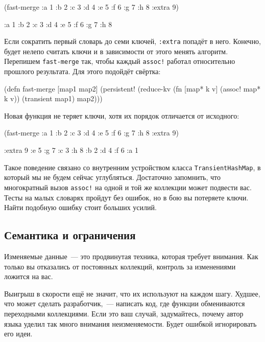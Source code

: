 \begin{english}
  \begin{clojure}
(fast-merge
 {:a 1 :b 2 :c 3 :d 4 :e 5 :f 6 :g 7 :h 8}
 {:extra 9})

{:a 1 :b 2 :c 3 :d 4 :e 5 :f 6 :g 7 :h 8}
  \end{clojure}
\end{english}

Если сократить первый словарь до семи ключей, \verb|:extra| попадёт в
него. Конечно, будет нелепо считать ключи и в зависимости от этого менять
алгоритм. Перепишем \verb|fast-merge| так, чтобы каждый \verb|assoc!| работал
относительно прошлого результата. Для этого подойдёт свёртка:

\begin{english}
  \begin{clojure}
(defn fast-merge [map1 map2]
  (persistent!
   (reduce-kv
    (fn [map* k v]
      (assoc! map* k v))
    (transient map1)
    map2)))
  \end{clojure}
\end{english}

Новая функция не теряет ключи, хотя их порядок отличается от исходного:


\begin{english}
  \begin{clojure}
(fast-merge
 {:a 1 :b 2 :c 3 :d 4 :e 5 :f 6 :g 7 :h 8}
 {:extra 9})

{:extra 9 :e 5 :g 7 :c 3 :h 8 :b 2 :d 4 :f 6 :a 1}
  \end{clojure}
\end{english}

Такое поведение связано со внутренним устройством класса
\texttt{Tran\-si\-ent\-Hash\-Map}, в который мы не будем сейчас
углубляться. Достаточно запомнить, что многократный вызов \verb|assoc!| на одной
и той же коллекции может подвести вас. Тесты на малых словарях пройдут без
ошибок, но в бою вы потеряете ключи. Найти подобную ошибку стоит больших усилий.

\subsection{Семантика и ограничения}

Изменяемые данные~--- это продвинутая техника, которая требует внимания. Как только
вы отказались от постоянных коллекций, контроль за изменениями ложится на вас.

Выигрыш в скорости ещё не значит, что их используют на каждом шагу. Худшее, что
может сделать разработчик,~--- написать код, где функции обмениваются
переходными коллекциями. Если это ваш случай, задумайтесь, почему автор языка
уделил так много внимания неизменяемости. Будет ошибкой игнорировать его идеи.

